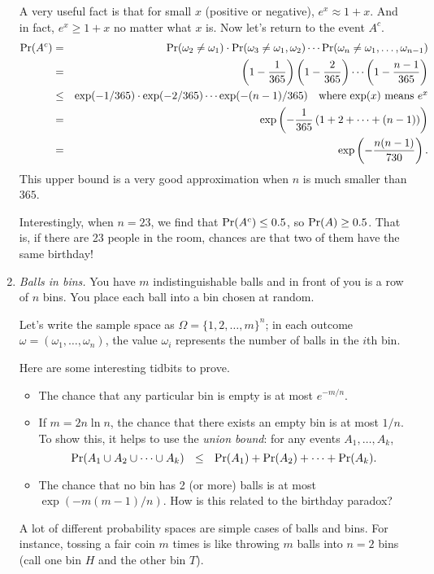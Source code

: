 \begin{enumerate}
A very useful fact is that for small $x$ (positive or negative), $e^x \approx 1+x$. And in fact, $e^x \geq 1+x$ no matter what $x$ is. Now let's return to the event $A^c$.
\begin{eqnarray*}
\mbox{\rm Pr}(A^c) & = & \mbox{\rm Pr}(\omega_2 \neq \omega_1) \cdot \mbox{\rm Pr}(\omega_3 \neq \omega_1, \omega_2) \cdots \mbox{\rm Pr}(\omega_n \neq \omega_1, \ldots, \omega_{n-1}) \\
& = & \left(1 - \frac{1}{365} \right) \left(1 - \frac{2}{365} \right) \cdots \left(1 - \frac{n-1}{365} \right) \\
& \leq & \exp(-1/365) \cdot \exp(-2/365) \cdots \exp(-(n-1)/365) \mbox{\ \ \ where $\exp(x)$ means $e^x$} \\
& = & \exp \left( - \frac{1}{365} \left(1 + 2 + \cdots + (n-1) \right) \right) \\
& = & \exp \left( - \frac{n(n-1)}{730} \right). 
\end{eqnarray*}
This upper bound is a very good approximation when $n$ is much smaller than $365$. 

Interestingly, when $n = 23$, we find that $\mbox{\rm Pr}(A^c) \leq 0.5$, so $\mbox{\rm Pr}(A) \geq 0.5$. That is, if there are 23 people in the room, chances are that two of them have the same birthday!

\item {\it Balls in bins.} You have $m$ indistinguishable balls and in front of you is a row of $n$ bins. You place each ball into a bin chosen at random.

Let's write the sample space as $\Omega = \{1,2,\ldots, m\}^n$; in each outcome $\omega = (\omega_1, \ldots, \omega_n)$, the value $\omega_i$ represents the number of balls in the $i$th bin.

Here are some interesting tidbits to prove.
\begin{itemize}
\item The chance that any particular bin is empty is at most $e^{-m/n}$.
\item If $m = 2n \ln n$, the chance that there exists an empty bin is at most $1/n$. To show this, it helps to use the {\it union bound}: for any events $A_1, \ldots, A_k$,
$$ \pr(A_1 \cup A_2 \cup \cdots \cup A_k) \ \ \leq \ \ \pr(A_1) + \pr(A_2) + \cdots + \pr(A_k).$$
\item The chance that no bin has 2 (or more) balls is at most $\exp(-m(m-1)/n)$. How is this related to the birthday paradox?
\end{itemize}
A lot of different probability spaces are simple cases of balls and bins. For instance, tossing a fair coin $m$ times is like throwing $m$ balls into $n=2$ bins (call one bin $H$ and the other bin $T$).
 
\end{enumerate}

